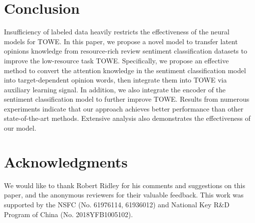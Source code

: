 \documentclass[letterpaper]{article} \usepackage{aaai20}  \usepackage{times}  \usepackage{helvet} \usepackage{courier}  \usepackage[hyphens]{url}  \usepackage{graphicx} \urlstyle{rm} \def\UrlFont{\rm}  \usepackage{graphicx}
\begin{document}
\section{Conclusion}
Insufficiency of labeled data heavily restricts the effectiveness of the neural models for TOWE. In this paper, we propose a novel model to transfer latent opinions knowledge from resource-rich review sentiment classification datasets to improve the low-resource task TOWE. Specifically, we propose an effective method to convert the attention knowledge in the sentiment classification model into target-dependent opinion words, then integrate them into TOWE via auxiliary learning signal. In addition, we also integrate the encoder of the sentiment classification model to further improve TOWE. Results from numerous experiments indicate that our approach achieves better performance than other state-of-the-art methods. Extensive analysis also demonstrates the effectiveness of our model.

\section{Acknowledgments}
We would like to thank Robert Ridley for his comments and suggestions on this paper, and the anonymous reviewers for their valuable feedback. This work was supported by the NSFC (No. 61976114, 61936012) and National Key R\&D Program of China (No. 2018YFB1005102).



\end{document}
